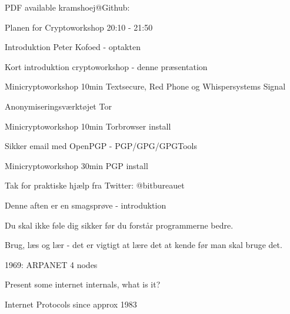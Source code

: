 \documentclass[20pt,landscape,a4paper,footrule]{foils}
\begin{document}

\centerline{\footnotesize PDF available kramshoej@Github: \jobname}


Planen for Cryptoworkshop 20:10 - 21:50
\begin{list2}
\item Introduktion Peter Kofoed - optakten
\item Kort introduktion cryptoworkshop - denne præsentation
\item Minicryptoworkshop 10min Textsecure, Red Phone og Whispersystems Signal
\item Anonymiseringsværktøjet Tor
\item Minicryptoworkshop 10min Torbrowser install
\item Sikker email med OpenPGP - PGP/GPG/GPGTools
\item Minicryptoworkshop 30min PGP install

\end{list2}

Tak for praktiske hjælp fra  Twitter: @bitbureauet




\begin{center}
Denne aften er en smagsprøve - introduktion

Du skal ikke føle dig sikker før du forstår programmerne bedre.

Brug, læs og lær - det er vigtigt at lære det at kende før man skal bruge det.
\end{center}




\centerline{1969: ARPANET 4 nodes}


\begin{list1}
\item Present some internet internals, what is it?
\end{list1}


\vskip 1cm
\centerline{Internet Protocols since approx 1983}
\end{document}
